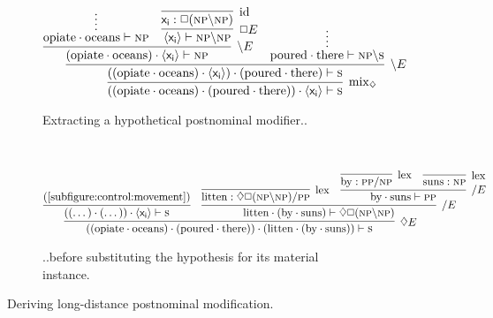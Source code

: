 \begin{figure}
	\centering
	\begin{subfigure}{1\textwidth}
		\smaller
		\[
			\infer[\rulestyle{mix}_{\diamond}]{((\w{opiate}\sbind\w{oceans})\sbind(\w{poured}\sbind\w{there}))\sbind\bracket{\term{x_i}} \vdash \s}{
				\infer[\divleft E]{((\w{opiate}\sbind\w{oceans})\sbind\bracket{\term{x_i}})\sbind(\w{poured}\sbind\w{there}) \vdash \s}{
					\infer[\divleft E]{(\w{opiate}\sbind\w{oceans})\sbind\bracket{\term{x_i}} \vdash \np}{
						\infer*{\w{opiate}\sbind\w{oceans} \vdash \np}{}
						&
						\infer[\Box E]{\bracket{\term{x_i}} \vdash \np\divleft\np}{
							\infer[\Ax]{\term{x_i}: \Box (\np\divleft\np)}{}
						}
					}
					&
					\infer*{\w{poured}\sbind\w{there} \vdash \np\divleft\s}{}
				}
			}
		\]
		\caption{Extracting a hypothetical postnominal modifier..}
		\label{subfigure:control:movement}
	\end{subfigure}\\[\midsep]
	\begin{subfigure}{1\textwidth}
	\centering
		\smaller
		\[
			\infer[\diamond E]{((\w{opiate}\sbind\w{oceans})\sbind(\w{poured}\sbind\w{there}))\sbind(\w{litten}\sbind(\w{by}\sbind\w{suns})) \vdash \s}{
				\infer{((\dots)\sbind(\dots))\sbind\bracket{\term{x_i}} \vdash \s}{\text{(\ref{subfigure:control:movement})}}
				&
				\infer[\divright E]{\w{litten}\sbind(\w{by}\sbind\w{suns}) \vdash \diamond\Box(\np\divleft\np)}{
					\infer[\Lex]{\w{litten} : \diamond\Box(\np\divleft\np)\divright\pp }{}
					&
					\infer[\divright E]{\w{by}\sbind\w{suns} \vdash \pp}{
						\infer[\Lex]{\w{by}: \pp\divright\np}{}
						&
						\infer[\Lex]{\w{suns}: \np}{}
					}
				}
			}
		\]
		\caption{..before substituting the hypothesis for its material instance.}
		\label{subfigure:control:substitution}
	\end{subfigure}
	\caption{Deriving long-distance postnominal modification.}
	\label{figure:lovecraft_postnominal}
\end{figure}


